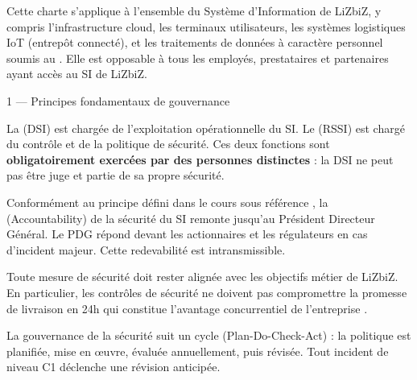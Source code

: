 \documentclass[12pt,a4paper]{article}
\begin{document}
\begin{boxscope}
Cette charte s'applique à l'ensemble du Système d'Information de LiZbiZ,
y compris l'infrastructure cloud, les terminaux utilisateurs, les systèmes
logistiques IoT (entrepôt connecté), et les traitements de données à
caractère personnel soumis au . Elle est opposable à tous les
employés, prestataires et partenaires ayant accès au SI de LiZbiZ.
\end{boxscope}

\begin{boxarticle}{1 --- Principes fondamentaux de gouvernance}

La  (DSI) est chargée de
l'exploitation opérationnelle du SI. Le  (RSSI) est chargé du contrôle et de la
politique de sécurité. Ces deux fonctions sont \textbf{obligatoirement
exercées par des personnes distinctes} : la DSI ne peut pas être juge
et partie de sa propre sécurité.

Conformément au principe défini dans le cours sous référence
, la  (Accountability) de la sécurité
du SI remonte jusqu'au Président Directeur Général. Le PDG répond devant
les actionnaires et les régulateurs en cas d'incident majeur. Cette
redevabilité est intransmissible.

Toute mesure de sécurité doit rester alignée avec les objectifs métier de
LiZbiZ. En particulier, les contrôles de sécurité ne doivent pas
compromettre la promesse de livraison en 24h qui constitue l'avantage
concurrentiel de l'entreprise .

La gouvernance de la sécurité suit un cycle 
(Plan-Do-Check-Act) : la politique est planifiée, mise en œuvre, évaluée
annuellement, puis révisée. Tout incident de niveau C1
 déclenche une révision anticipée.

\end{boxarticle}

\vspace{0.4cm}
\end{document}
